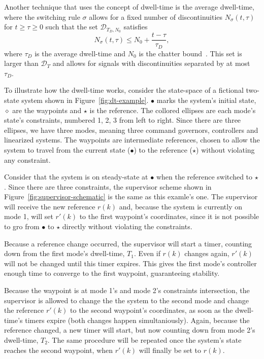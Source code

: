 Another technique that uses the concept of dwell-time is the average dwell-time,
where the switching rule \(\sigma\) allows for a fixed number of discontinuities
\(N_{\sigma}(t,\tau)\) for \(t\ge{}\tau{}\ge{}0\) such that the set
\(\mathcal{D}_{T_{D},N_{0}}\) satisfies
%
\begin{equation}
  N_{\sigma}(t,\tau) \le{} N_{0} + \frac{t-\tau}{\tau_{D}},
\end{equation}
%
where \(\tau_{D}\) is the average dwell-time and \(N_{0}\) is the chatter
bound~\parencite{hespanha.morse:stability}. This set is larger than
\(\mathcal{D}_{T}\) and allows for signals with discontinuities separated by at
most \(\tau_{D}\).

To illustrate how the dwell-time works, consider the state-space of a fictional
two-state system shown in Figure~\ref{fig:dt-example}. \(\bullet\) marks the system's
initial state, \(\diamond\) are the waypoints and \(\star\) is the reference. The collored
ellipses are each mode's state's constraints, numbered 1, 2, 3 from left to
right. Since there are three ellipses, we have three modes, meaning three
command governors, controllers and linearized systems. The waypoints are
intermediate references, chosen to allow the system to travel from the current
state (\(\bullet\)) to the reference (\(\star\)) without violating any constraint.



Consider that the system is on steady-state at \(\bullet\) when the reference switched
to \(\star\). Since there are three constraints, the supervisor scheme shown in
Figure~\ref{fig:supervisor-schematic} is the same as this examle's one. The
supervisor will receive the new reference \(r(k)\) and, because the system is
currently on mode 1, will set \(r'(k)\) to the first waypoint's coordinates,
since it is not possible to gro from \(\bullet\) to \(\star\) directly without violating
the constraints.

Because a reference change occurred, the supervisor will start a timer, counting
down from the first mode's dwell-time, \(T_{1}\). Even if \(r(k)\) changes
again, \(r'(k)\) will not be changed until this timer expires. This gives the
first mode's controller enough time to converge to the first waypoint,
guaranteeing stability.

Because the waypoint is at mode 1's and mode 2's constraints intersection, the
supervisor is allowed to change the the system to the second mode and change the
reference \(r'(k)\) to the second waypoint's coordinates, as soon as the
dwell-time's timers expire (both changes happen simultaniously). Again, because
the reference changed, a new timer will start, but now counting down from mode
2's dwell-time, \(T_{2}\). The same procedure will be repeated once the system's
state reaches the second waypoint, when \(r'(k)\) will finally be set to
\(r(k)\).

